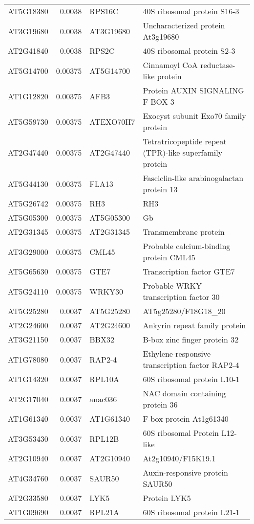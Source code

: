 \documentclass[a4paper]{article}
\begin{document}
\begin{center}
\begin{tabular}{lrll}
AT5G18380 & 0.0038 & RPS16C & 40S ribosomal protein S16-3\\
AT3G19680 & 0.0038 & AT3G19680 & Uncharacterized protein At3g19680\\
AT2G41840 & 0.0038 & RPS2C & 40S ribosomal protein S2-3\\
AT5G14700 & 0.00375 & AT5G14700 & Cinnamoyl CoA reductase-like protein\\
AT1G12820 & 0.00375 & AFB3 & Protein AUXIN SIGNALING F-BOX 3\\
AT5G59730 & 0.00375 & ATEXO70H7 & Exocyst subunit Exo70 family protein\\
AT2G47440 & 0.00375 & AT2G47440 & Tetratricopeptide repeat (TPR)-like superfamily protein\\
AT5G44130 & 0.00375 & FLA13 & Fasciclin-like arabinogalactan protein 13\\
AT5G26742 & 0.00375 & RH3 & RH3\\
AT5G05300 & 0.00375 & AT5G05300 & Gb\\
AT2G31345 & 0.00375 & AT2G31345 & Transmembrane protein\\
AT3G29000 & 0.00375 & CML45 & Probable calcium-binding protein CML45\\
AT5G65630 & 0.00375 & GTE7 & Transcription factor GTE7\\
AT5G24110 & 0.00375 & WRKY30 & Probable WRKY transcription factor 30\\
AT5G25280 & 0.0037 & AT5G25280 & AT5g25280/F18G18\_20\\
AT2G24600 & 0.0037 & AT2G24600 & Ankyrin repeat family protein\\
AT3G21150 & 0.0037 & BBX32 & B-box zinc finger protein 32\\
AT1G78080 & 0.0037 & RAP2-4 & Ethylene-responsive transcription factor RAP2-4\\
AT1G14320 & 0.0037 & RPL10A & 60S ribosomal protein L10-1\\
AT2G17040 & 0.0037 & anac036 & NAC domain containing protein 36\\
AT1G61340 & 0.0037 & AT1G61340 & F-box protein At1g61340\\
AT3G53430 & 0.0037 & RPL12B & 60S ribosomal Protein L12-like\\
AT2G10940 & 0.0037 & AT2G10940 & At2g10940/F15K19.1\\
AT4G34760 & 0.0037 & SAUR50 & Auxin-responsive protein SAUR50\\
AT2G33580 & 0.0037 & LYK5 & Protein LYK5\\
AT1G09690 & 0.0037 & RPL21A & 60S ribosomal protein L21-1\\

\end{tabular}
\end{center}
\end{document}
